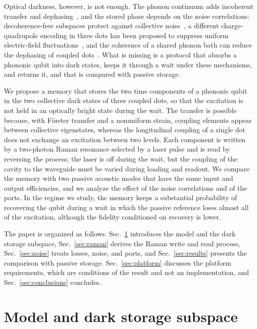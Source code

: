 \documentclass[aps,pra,preprint,groupedaddress,amsmath,amssymb,floatfix]{revtex4-2}
\begin{document}
Optical darkness, however, is not enough. The phonon continuum adds incoherent transfer and dephasing~\cite{rozbicki2008,muljarov2005,sirkina2025,daniels2013}, and the stored phase depends on the noise correlations: decoherence-free subspaces protect against collective noise~\cite{lidar1998}, a different charge-quadrupole encoding in three dots has been proposed to suppress uniform electric-field fluctuations~\cite{friesen2017}, and the coherence of a shared phonon bath can reduce the dephasing of coupled dots~\cite{hall2025}. What is missing is a protocol that absorbs a phononic qubit into dark states, keeps it through a wait under these mechanisms, and returns it, and that is compared with passive storage.

We propose a memory that stores the two time components of a phononic qubit in the two collective dark states of three coupled dots, so that the excitation is not held in an optically bright state during the wait. The transfer is possible because, with F\"orster transfer and a nonuniform strain, coupling elements appear between collective eigenstates, whereas the longitudinal coupling of a single dot does not exchange an excitation between two levels. Each component is written by a two-photon Raman resonance selected by a laser pulse and is read by reversing the process; the laser is off during the wait, but the coupling of the cavity to the waveguide must be varied during loading and readout. We compare the memory with two passive acoustic modes that have the same input and output efficiencies, and we analyze the effect of the noise correlations and of the ports. In the regime we study, the memory keeps a substantial probability of recovering the qubit during a wait in which the passive reference loses almost all of the excitation, although the fidelity conditioned on recovery is lower.

The paper is organized as follows. Sec.~\ref{sec:model} introduces the model and the dark storage subspace, Sec.~\ref{sec:raman} derives the Raman write and read process, Sec.~\ref{sec:noise} treats losses, noise, and ports, and Sec.~\ref{sec:results} presents the comparison with passive storage. Sec.~\ref{sec:platform} discusses the platform requirements, which are conditions of the result and not an implementation, and Sec.~\ref{sec:conclusions} concludes.

\section{Model and dark storage subspace}
\label{sec:model}
\end{document}
